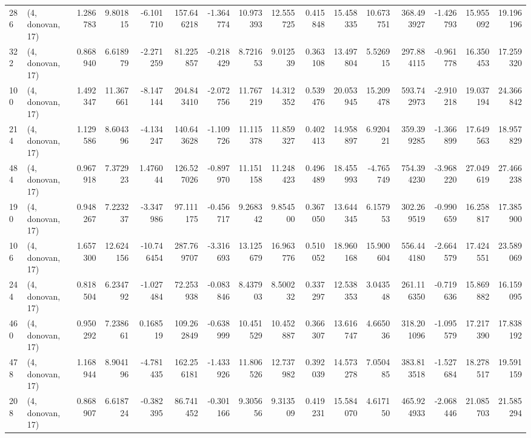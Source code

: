\begin{tabular}{llrrrrrrrrrrrrrr}
286 &  (4, donovan, 17) &   1.286783 &   9.801815 &  -6.101710 &   157.646218 &  -1.364774 &  10.973393 &  12.555725 &  0.415848 &  15.458335 &  10.673751 &   368.493927 &  -1.426793 &  15.955092 &  19.196196 \\
322 &  (4, donovan, 17) &   0.868940 &   6.618979 &  -2.271259 &    81.225857 &  -0.218429 &   8.721653 &   9.012539 &  0.363108 &  13.497804 &   5.526915 &   297.884115 &  -0.961778 &  16.350453 &  17.259320 \\
100 &  (4, donovan, 17) &   1.492347 &  11.367661 &  -8.147144 &   204.843410 &  -2.072756 &  11.767219 &  14.312352 &  0.539476 &  20.053945 &  15.209478 &   593.742973 &  -2.910218 &  19.037194 &  24.366842 \\
214 &  (4, donovan, 17) &   1.129586 &   8.604396 &  -4.134247 &   140.643628 &  -1.109726 &  11.115378 &  11.859327 &  0.402413 &  14.958897 &   6.920421 &   359.399285 &  -1.366899 &  17.649563 &  18.957829 \\
484 &  (4, donovan, 17) &   0.967918 &   7.372923 &   1.476044 &   126.527026 &  -0.897970 &  11.151158 &  11.248423 &  0.496489 &  18.455993 &  -4.765749 &   754.394230 &  -3.968220 &  27.049619 &  27.466238 \\
190 &  (4, donovan, 17) &   0.948267 &   7.223237 &  -3.347986 &    97.111175 &  -0.456717 &   9.268342 &   9.854500 &  0.367050 &  13.644345 &   6.157953 &   302.269519 &  -0.990659 &  16.258817 &  17.385900 \\
106 &  (4, donovan, 17) &   1.657300 &  12.624156 & -10.746454 &   287.769707 &  -3.316693 &  13.125679 &  16.963776 &  0.510052 &  18.960168 &  15.900604 &   556.444180 &  -2.664579 &  17.424551 &  23.589069 \\
244 &  (4, donovan, 17) &   0.818504 &   6.234792 &  -1.027484 &    72.253938 &  -0.083846 &   8.437903 &   8.500232 &  0.337297 &  12.538353 &   3.043548 &   261.116350 &  -0.719636 &  15.869882 &  16.159095 \\
460 &  (4, donovan, 17) &   0.950292 &   7.238661 &   0.168519 &   109.262849 &  -0.638999 &  10.451529 &  10.452887 &  0.366307 &  13.616747 &   4.665036 &   318.201096 &  -1.095579 &  17.217390 &  17.838192 \\
478 &  (4, donovan, 17) &   1.168944 &   8.904196 &  -4.781435 &   162.256181 &  -1.433926 &  11.806526 &  12.737982 &  0.392039 &  14.573278 &   7.050485 &   383.813518 &  -1.527684 &  18.278517 &  19.591159 \\
208 &  (4, donovan, 17) &   0.868907 &   6.618724 &  -0.382395 &    86.741452 &  -0.301166 &   9.305656 &   9.313509 &  0.419231 &  15.584070 &   4.617150 &   465.924933 &  -2.068446 &  21.085703 &  21.585294 \\

\end{tabular}
